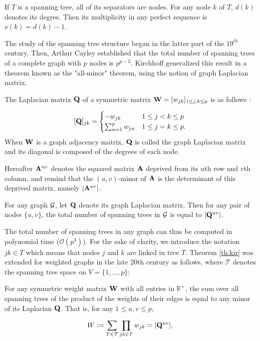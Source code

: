 \begin{prop}
If $T$ is a spanning tree, all of its separators are nodes. For any node $k$ of $T$, $d(k)$ denotes its degree. Then its multiplicity in any perfect sequence is $\nu(k) = d(k)-1$.
\end{prop}
 
 
 The study of the spanning tree structure began in the latter part of the $19^{th}$ century. Then, Arthur Cayley established that the total number of spanning trees of a complete graph with $p$ nodes is $p^{p-2}$. Kirchhoff generalized this result in a theorem known as the "all-minor" theorem, using the notion of graph Laplacian matrix.
  \begin{definition}
 \label{laplacian}
 The Laplacian matrix ${\bf Q}$ of a symmetric matrix ${\bf W}=[w_{jk} ]_{1\leq j,k\leq p}$ is as follows :

\[
 [{\bf Q}]_{jk}  =\begin{cases}
    -w_{jk}  & 1\leq j<k \leq p\\
    \sum_{u=1}^p w_{ju} & 1\leq j=k \leq p.
    \end{cases}
\]
When ${\bf W}$ is a graph adjacency matrix, ${\bf Q}$ is called the graph Laplacian matrix and its diagonal is composed of the degrees of each node.
 \end{definition}
 
 Hereafter ${\bf A}^{uv}$ denotes the squared matrix ${\bf A}$ deprived from its $u$th row and $v$th column, and remind that the $(u, v)$-minor of ${\bf A}$ is the determinant of this deprived matrix, namely $|{\bf A}^{uv}|$.
 
 \begin{theorem}\label{th:kir}
 For any graph $\mathcal{G}$, let  ${\bf Q}$ denote its graph Laplacian matrix. Then for any  pair of nodes $\{u,v\}$, the total number of spanning trees in $\mathcal{G}$ is equal to  $|{\bf Q}^{uv}|$.
\end{theorem}  

 
The total number of spanning trees in any graph can thus be computed in polynomial time ($\mathcal{O}(p^3)$). For the sake of clarity, we introduce the notation $jk\in T$ which means that nodes $j$ and $k$ are linked in tree $T$. Theorem \ref{th:kir} was extended for weighted graphs in the late 20th century as follows, where $\mathcal{T}$ denotes the spanning tree space on $V=\{1,...,p\}$:

\begin{theorem} \label{thmm:MTT}
    For any symmetric weight matrix ${\bf W}$ with all entries in $\mathds{R}^+$, the sum over all spanning trees of the product of the weights of their edges is equal to any minor of its Laplacian ${\bf Q}$. That is, for any $1 \leq u, v \leq p$,
 
   \[
    W := \sum_{T\in\mathcal{T}} \prod_{jk\in T} w_{jk} = |{\bf Q}^{uv}|.
    \]
   
\end{theorem}    

